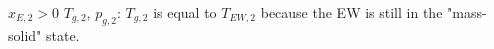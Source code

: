 \( x_{E,2} > 0 \)  
\( T_{g,2} \), \( p_{g,2} \):  
\( T_{g,2} \) is equal to \( T_{EW,2} \) because the EW is still in the "mass-solid" state.